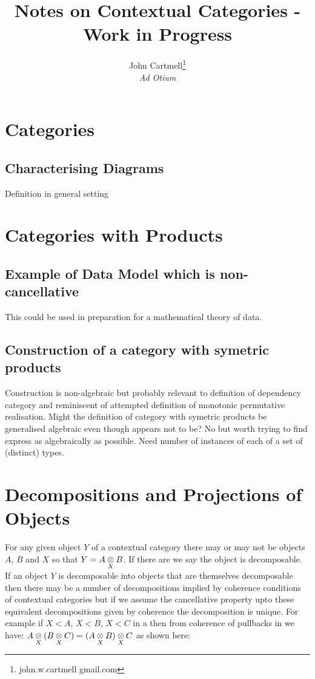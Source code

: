 \documentclass[10pt,a4paper]{scrartcl}
\title{Notes on Contextual Categories - Work in Progress}
\author{John Cartmell\footnote{john.w.cartmell gmail.com}\\ \normalsize{\textit{Ad Otium}}}
\begin{document}
\section{Categories}
\subsection{Characterising Diagrams}
Definition in general setting

\section{Categories with Products}

\subsection{Example of Data Model which is non-cancellative}
This could be used in preparation for a mathematical theory of data.
\subsection{Construction of a category with symetric products}
Construction is non-algebraic but probably relevant to definition of dependency category
and reminiscent of attempted definition of monotonic permutative realisation.
Might the definition of category with symetric products be generalised algebraic even though appears not to be? No but worth trying to find express as algebraically as possible. Need number of instances of each of a set of (distinct) types. 



\section{Decompositions and Projections of Objects}
For any given object $Y$ of a contextual category there may or may not be objects $A$, $B$ and $X$ so that
$Y = \crossx{A}{B}{X}$. If there are we say the object is decomposable. If an object $Y$ is decomposable into objects that
are themselves decomposable then there may be a number of decompositions implied by coherence conditions of contextual
categories but if we assume the cancellative property upto these equivalent decompositions given by coherence
the decomposition is unique. 
\noindent
For example if $X < A$, $X < B$, $X < C$ in a \ccat then from coherence of pullbacks in \ccat we have:
$\crossx{A}{(\crossx{B}{C}{X})}{X} = \crossx{(\crossx{A}{B}{X})}{C}{X}$ as shown here:
 
\end{document}
